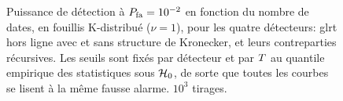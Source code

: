 %
%
%
\begin{figure}[htbp]
  \centering
  
  \provPuissanceKQR[.5cm]
  \caption{Puissance de détection à $P_{\mathrm{fa}}=10^{-2}$ en fonction du nombre de
  dates, en fouillis K-distribué ($\nu=1$), pour les quatre détecteurs: glrt
  hors ligne avec et sans structure de Kronecker, et leurs contreparties
  récursives. Les seuils sont fixés par détecteur et par $T$ au quantile
  empirique des statistiques sous $\mathcal{H}_0$, de sorte que toutes les
  courbes se lisent à la même fausse alarme. $10^3$ tirages.
  \provPuissanceK}
  \label{fig:detection-online-puissance}
\end{figure}

